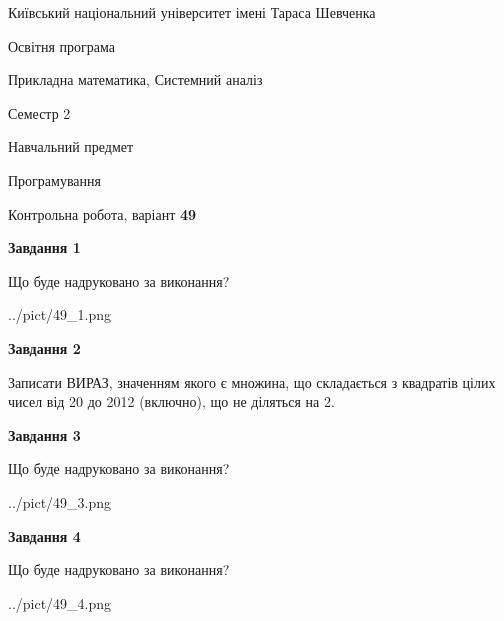 \documentclass[12pt, ukrainian]{article}
\begin{document}
{{\begin {small}\par
{ \center  Київський національний університет імені Тараса Шевченка \par}
{\parbox {5 cm}{Освітня програма \hfill}{\parbox {8 cm}{Прикладна математика, Системний аналіз \hfill}}\parbox {5 cm}{\hfill Семестр 2}}\par
{\parbox {5 cm} {Навчальний предмет \hfill}\parbox {7 cm}{Програмування \hfill}\parbox {6cm}{\hfill}\par}\vspace{-7pt} \end{small}}{\center Контрольна робота, варіант  \No \textbf
{ 49 }\par}}
{
\begin {large}
{\begin {center}\textbf{Завдання 1}\end {center}}\par
Що буде надруковано за виконання?\par\par
\begin{center}
	{../pict/49_1.png}
\end{center}
\newpage

{\begin {center}\textbf{Завдання 2}\end {center}}\par
Записати ВИРАЗ, значенням якого є множина, що складається з квадратів цілих чисел від 20 до 2012 (включно), що не діляться на 2.\par
\newpage

{\begin {center}\textbf{Завдання 3}\end {center}}\par
Що буде надруковано за виконання?
\begin{center}
	{../pict/49_3.png}
\end{center}
\newpage

{\begin {center}\textbf{Завдання 4}\end {center}}\par
Що буде надруковано за виконання?\par
\begin{center}
	{../pict/49_4.png}
\end{center}
\newpage


\end{large}}
\end{document}
